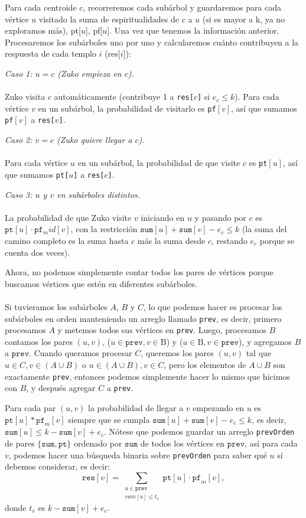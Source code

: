 Para cada centroide $c$, recorreremos cada subárbol y guardaremos para cada vértice $u$ visitado la suma de espiritualidades de $c$ a $u$ (si es mayor a k, ya no exploramos más), pt[$u$], pf[$u$]. Una vez que tenemos la información anterior. Procesaremos los subárboles uno por uno y calcularemos cuánto contribuyen a la respuesta de cada templo $i$ (res[$i$]):
 
\textit{Caso 1: $u = c$ (Zuko empieza en $c$).}
\\\\
Zuko visita $c$ automáticamente (contribuye 1 a \texttt{res[$c$]}
si $e_c \leq k$). Para cada vértice $v$ en un subárbol, la
probabilidad de visitarlo es \texttt{pf}$[v]$, así que sumamos \texttt{pf}$[v]$ a \texttt{res[$v$]}.
 
\textit{Caso 2: $v = c$ (Zuko quiere llegar a $c$).}
\\\\
Para cada vértice $u$ en un subárbol, la probabilidad de que visite
$c$ es \texttt{pt}$[u]$, así que sumamos \texttt{pt[$u$]} a \texttt{res[$c$]}.
 
\textit{Caso 3: $u$ y $v$ en subárboles distintos.}
\\\\
La probabilidad de que Zuko visite $v$ iniciando en $u$ y pasando
por $c$ es $\texttt{pt}[u] \cdot \texttt{pf$_mid$}[v]$, con la
restricción $\texttt{sum}[u] + \texttt{sum}[v] - e_c \leq k$ (la suma del camino completo es la suma hasta $c$ más la suma desde $c$,
restando $e_c$ porque se cuenta dos veces).
 
Ahora, no podemos simplemente contar todos los pares de vértices porque buscamos vértices que estén en diferentes subárboles.
\\\\Si tuvieramos los subárboles $A$, $B$ y $C$, lo que podemos hacer es procesar los subárboles en orden manteniendo un arreglo llamado \texttt{prev}, es decir, primero procesamos $A$ y metemos todos sus vértices en \texttt{prev}. Luego, procesamos $B$ contamos los pares $(u,v)$, ($u \in \texttt{prev}, v \in \text{B}$) y ($u \in \text{B}, v \in \texttt{prev}$), y agregamos $B$ a $\texttt{prev}$. Cuando queramos procesar $C$, queremos los pares $(u,v)$ tal que $u\in C, v \in (A \cup B)$ o $u\in (A \cup B), v \in C$, pero los elementos de $A\cup B$ son exactamente \texttt{prev}, entonces podemos simplemente hacer lo mismo que hicimos con $B$, y después agregar $C$ a \texttt{prev}.

Para cada par $(u,v)$ la probabilidad de llegar a $v$ empezando en $u$ es $\texttt{pt}[u]*\texttt{pf}_m[v]$ siempre que se cumpla $\texttt{sum}[u]+\texttt{sum}[v]-e_c \leq k$, es decir, $\texttt{sum}[u] \leq k - \texttt{sum}[v]+ e_c$. Nótese que podemos guardar un arreglo \texttt{prevOrden} de pares $\{\texttt{sum}, \texttt{pt}\}$ ordenado por $\texttt{sum}$ de todos los vértices en $\texttt{prev}$, así para cada $v$, podemos hacer una búsqueda binaria sobre \texttt{prevOrden} para saber qué $u$ sí debemos considerar, es decir:
\[\texttt{res}[v]=\sum_{\substack{u \in \texttt{prev} \\ sum[u]\leq t_v}} \texttt{pt}[u]\cdot \texttt{pf}_m[v],\]
donde $t_v$ es $k - \texttt{sum}[v]+ e_c$.


